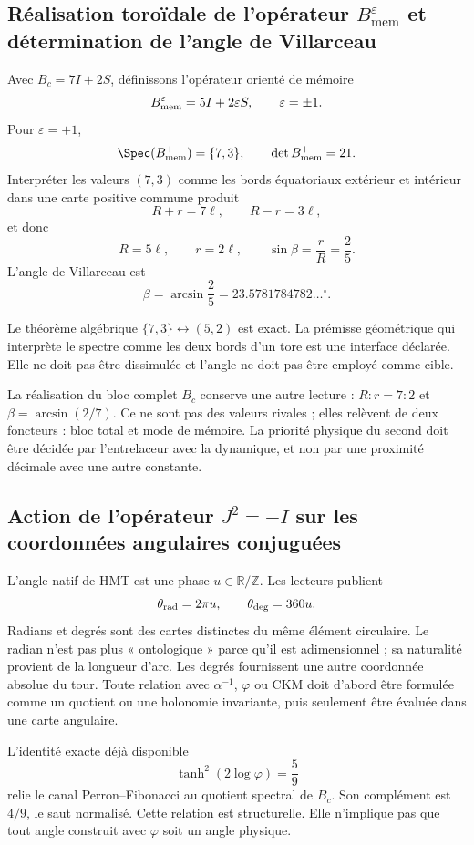 \subsection{Réalisation toroïdale de l’opérateur \texorpdfstring{\(B_{\mathrm{mem}}^{\varepsilon}\)}{Bmem} et détermination de l’angle de Villarceau}

Avec \(B_c=7I+2S\), définissons l’opérateur orienté de mémoire
\[
B_{\rm mem}^{\varepsilon}=5I+2\varepsilon S,
\qquad\varepsilon=\pm1.
\]
Pour \(\varepsilon=+1\),
\[
\Spec(B_{\rm mem}^{+})=\{7,3\},
\qquad\det B_{\rm mem}^{+}=21.
\]
Interpréter les valeurs \((7,3)\) comme les bords équatoriaux extérieur et intérieur
dans une carte positive commune produit
\[
R+r=7\ell,\qquad R-r=3\ell,
\]
et donc
\[
R=5\ell,\qquad r=2\ell,\qquad
\sin\beta=\frac rR=\frac25.
\]
L’angle de Villarceau est
\[
\beta=\arcsin\frac25
=23.5781784782\ldots^\circ.
\]

Le théorème algébrique \(\{7,3\}\leftrightarrow(5,2)\) est exact. La prémisse
géométrique qui interprète le spectre comme les deux bords d’un tore est une
interface déclarée. Elle ne doit pas être dissimulée et l’angle ne doit pas être employé comme cible.

La réalisation du bloc complet \(B_c\) conserve une autre lecture :
\(R:r=7:2\) et \(\beta=\arcsin(2/7)\). Ce ne sont pas des valeurs rivales ; elles relèvent de
deux foncteurs : bloc total et mode de mémoire. La priorité physique du second
doit être décidée par l’entrelaceur avec la dynamique, et non par une proximité décimale avec
une autre constante.

\subsection{Action de l’opérateur \texorpdfstring{\(J^2=-I\)}{J2=-I} sur les coordonnées angulaires conjuguées}

L’angle natif de HMT est une phase \(u\in\mathbb R/\mathbb Z\). Les lecteurs
publient
\[
\theta_{\rm rad}=2\pi u,
\qquad
\theta_{\rm deg}=360u.
\]
Radians et degrés sont des cartes distinctes du même élément circulaire. Le radian
n’est pas plus « ontologique » parce qu’il est adimensionnel ; sa naturalité provient de la
longueur d’arc. Les degrés fournissent une autre coordonnée absolue du
tour. Toute relation avec \(\alpha^{-1}\), \(\varphi\) ou CKM doit
d’abord être formulée comme un quotient ou une holonomie invariante, puis seulement
être évaluée dans une carte angulaire.

L’identité exacte déjà disponible
\[
\tanh^2(2\log\varphi)=\frac59
\]
relie le canal Perron--Fibonacci au quotient spectral de \(B_c\). Son
complément est \(4/9\), le saut normalisé. Cette relation est structurelle.
Elle n’implique pas que tout angle construit avec \(\varphi\) soit un angle physique.

